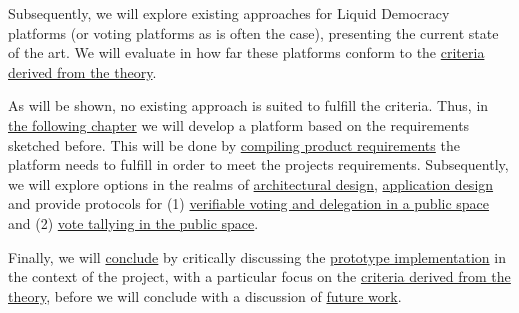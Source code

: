Subsequently, we will explore existing approaches for Liquid Democracy platforms (or voting platforms as is often the case), presenting the current state of the art. We will evaluate in how far these platforms conform to the \hyperref[sec:Criteria]{criteria derived from the theory}. 

As will be shown, no existing approach is suited to fulfill the criteria. Thus, in \hyperref[ch:ProjectRequirements]{the following chapter} we will develop a platform based on the requirements sketched before. This will be done by \hyperref[sec:SoftwareRequirements]{compiling product requirements} the platform needs to fulfill in order to meet the projects requirements. Subsequently, we will explore options in the realms of \hyperref[sec:ArchitecturalDesign]{architectural design}, \hyperref[sec:ApplicationDesign]{application design} and provide protocols for (1) \hyperref[sec:PublicDeclarationOfIntentProtocol]{verifiable voting and delegation in a public space} and (2) \hyperref[sec:VoteTallyingProtocol]{vote tallying in the public space}.

Finally, we will \hyperref[ch:Conclusion]{conclude} by critically discussing the \hyperref[sec:DiscussionImplementation]{prototype implementation} in the context of the project, with a particular focus on the \hyperref[sec:Criteria]{criteria derived from the theory}, before we will conclude with a discussion of \hyperref[sec:FutureWork]{future work}.